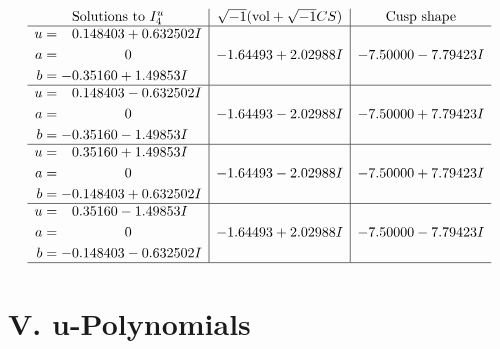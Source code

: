 \documentclass[1p]{elsarticle_modified}
\theoremstyle{definition}
\newcommand{\I}{\sqrt{-1}}
\begin{document}
$$\begin{array}{c|c|c}  
\text{Solutions to }I^u_{4}& \I (\text{vol} + \sqrt{-1}CS) & \text{Cusp shape}\\
 \hline 
\begin{aligned}
u &= \phantom{-}0.148403 + 0.632502 I \\
a &= \phantom{-0.000000 } 0 \\
b &= -0.35160 + 1.49853 I\end{aligned}
 & -1.64493 + 2.02988 I & -7.50000 - 7.79423 I \\ \hline\begin{aligned}
u &= \phantom{-}0.148403 - 0.632502 I \\
a &= \phantom{-0.000000 } 0 \\
b &= -0.35160 - 1.49853 I\end{aligned}
 & -1.64493 - 2.02988 I & -7.50000 + 7.79423 I \\ \hline\begin{aligned}
u &= \phantom{-}0.35160 + 1.49853 I \\
a &= \phantom{-0.000000 } 0 \\
b &= -0.148403 + 0.632502 I\end{aligned}
 & -1.64493 - 2.02988 I & -7.50000 + 7.79423 I \\ \hline\begin{aligned}
u &= \phantom{-}0.35160 - 1.49853 I \\
a &= \phantom{-0.000000 } 0 \\
b &= -0.148403 - 0.632502 I\end{aligned}
 & -1.64493 + 2.02988 I & -7.50000 - 7.79423 I\\
 \hline 
 \end{array}$$\newpage
\newpage\renewcommand{\arraystretch}{1}
\centering \section*{ V. u-Polynomials}
\end{document}
